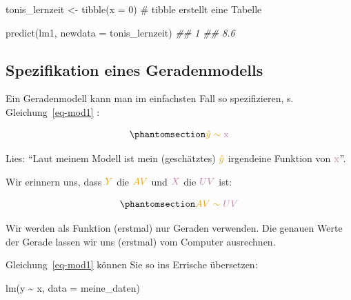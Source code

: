 \documentclass[
  letterpaper,
]{scrbook}
\newenvironment{Shaded}{\begin{snugshade}}{\end{snugshade}}
\newcommand{\AttributeTok}[1]{\textcolor[rgb]{0.40,0.45,0.13}{#1}}
\newcommand{\CommentTok}[1]{\textcolor[rgb]{0.37,0.37,0.37}{#1}}
\newcommand{\DecValTok}[1]{\textcolor[rgb]{0.68,0.00,0.00}{#1}}
\newcommand{\DocumentationTok}[1]{\textcolor[rgb]{0.37,0.37,0.37}{\textit{#1}}}
\newcommand{\FunctionTok}[1]{\textcolor[rgb]{0.28,0.35,0.67}{#1}}
\newcommand{\NormalTok}[1]{\textcolor[rgb]{0.00,0.23,0.31}{#1}}
\newcommand{\OtherTok}[1]{\textcolor[rgb]{0.00,0.23,0.31}{#1}}
\newcommand{\SpecialCharTok}[1]{\textcolor[rgb]{0.37,0.37,0.37}{#1}}
\theoremstyle{definition}
\theoremstyle{definition}
\theoremstyle{definition}
\theoremstyle{remark}
\begin{document}
\begin{Shaded}
\begin{Highlighting}[]
\NormalTok{tonis\_lernzeit }\OtherTok{\textless{}{-}} \FunctionTok{tibble}\NormalTok{(}\AttributeTok{x =} \DecValTok{0}\NormalTok{)  }\CommentTok{\# \textasciigrave{}tibble\textasciigrave{} erstellt eine Tabelle}
\end{Highlighting}
\end{Shaded}

\begin{Shaded}
\begin{Highlighting}[]
\FunctionTok{predict}\NormalTok{(lm1, }\AttributeTok{newdata =}\NormalTok{ tonis\_lernzeit)}
\DocumentationTok{\#\#   1 }
\DocumentationTok{\#\# 8.6}
\end{Highlighting}
\end{Shaded}

\subsection{Spezifikation eines
Geradenmodells}\label{spezifikation-eines-geradenmodells}

Ein Geradenmodell kann man im einfachsten Fall so spezifizieren, s.
Gleichung~\ref{eq-mod1} :

\begin{equation}\phantomsection\label{eq-mod1}{\color{ycol}{\hat{y}} \sim \color{xcol}{\text{x}}}\end{equation}

Lies: ``Laut meinem Modell ist mein (geschätztes)
\(\color{ycol}{\hat{y}}\) irgendeine Funktion von
\(\color{xcol}{\text{x}}\)''.

Wir erinnern uns, dass \(\color{ycol}{Y}\) die \(\color{ycol}{AV}\) und
\(\color{xcol}{X}\) die \(\color{xcol}{UV}\) ist:

\begin{equation}\phantomsection\label{eq-mod1}{\color{ycol}{AV} \sim \color{xcol}{UV}}\end{equation}

Wir werden als Funktion (erstmal) nur Geraden verwenden. Die genauen
Werte der Gerade lassen wir uns (erstmal) vom Computer ausrechnen.

Gleichung~\ref{eq-mod1} können Sie so ins Errische übersetzen:

\begin{Shaded}
\begin{Highlighting}[]
\FunctionTok{lm}\NormalTok{(y }\SpecialCharTok{\textasciitilde{}}\NormalTok{ x, }\AttributeTok{data =}\NormalTok{ meine\_daten)}
\end{Highlighting}
\end{Shaded}
\end{document}
